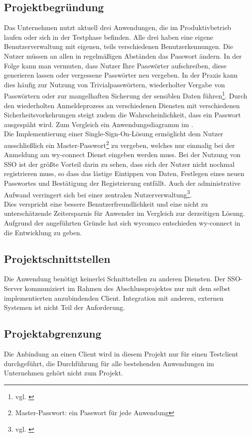 \subsection{Projektbegründung} 
\label{sec:Projektbegruendung}
Das Unternehmen nutzt aktuell drei Anwendungen, die im Produktivbetrieb laufen oder sich in der Testphase befinden. Alle drei haben eine eigene Benutzerverwaltung mit eigenen, teils verschiedenen Benutzerkennungen. Die Nutzer müssen an allen in regelmäßigen Abständen das Passwort ändern. 
In der Folge kann man vermuten, dass Nutzer Ihre Passwörter aufschreiben, diese generieren lassen oder vergessene Passwörter neu vergeben. In der Praxis kann dies häufig zur Nutzung von Trivialpasswörtern, wiederholter Vergabe von Passwörtern oder zur mangelhaften Sicherung der sensiblen Daten führen\footnote{vgl. \cite{datenschutzbeauftragter}}. 
Durch den wiederholten Anmeldeprozess an verschiedenen Diensten mit verschiedenen Sicherheitsvorkehrungen steigt zudem die Wahrscheinlichkeit, dass ein Passwort ausgespäht wird. 
Zum Vergleich ein Anwendungsdiagramm im . \\
Die Implementierung einer \glqq Single-Sign-On-Lösung\grqq{} ermöglicht dem Nutzer ausschließlich ein Master-Passwort\footnote{Master-Passwort: ein Passwort für jede Anwendung} zu vergeben, welches nur einmalig bei der Anmeldung am wy-connect Dienst eingeben werden muss. Bei der Nutzung von \ac{SSO} ist der größte Vorteil darin zu sehen, dass sich der Nutzer nicht nochmal registrieren muss, so dass das lästige Eintippen von Daten, Festlegen eines neuen Passwortes und Bestätigung der Registrierung entfällt. Auch der administrative Aufwand verringert sich bei einer zentralen Nutzerverwaltung\footnote{vgl. \cite{univention}}.\\
Dies verspricht eine bessere Benutzerfreundlichkeit und eine nicht zu unterschätzende Zeitersparnis für Anwender im Vergleich zur derzeitigen Lösung. 
Aufgrund der angeführten Gründe hat sich wycomco entschieden wy-connect in die Entwicklung zu geben.
\subsection{Projektschnittstellen} 
\label{sec:Projektschnittstellen}
Die Anwendung benötigt keinerlei Schnittstellen zu anderen Diensten. Der \ac{SSO}-Server kommuniziert im Rahmen des Abschlussprojektes nur mit dem selbst implementierten anzubindenden Client. 
Integration mit anderen, externen Systemen ist nicht Teil der Anforderung.
\subsection{Projektabgrenzung} 
\label{sec:Projektabgrenzung}
Die Anbindung an einen Client wird in diesem Projekt nur für einen Testclient durchgeführt, die Durchführung für alle bestehenden Anwendungen im Unternehmen gehört nicht zum Projekt.